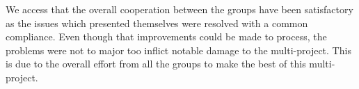 We access that the overall cooperation between the groups have been satisfactory as the issues which presented themselves were resolved with a common compliance. Even though that improvements could be made to process, the problems were not to major too inflict notable damage to the multi-project. This is due to the overall effort from all the groups to make the best of this multi-project.




































